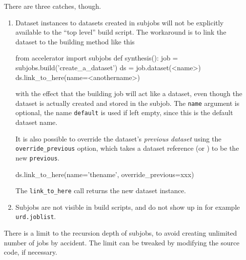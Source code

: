 There are three catches, though.
\begin{enumerate}
\item
Dataset instances to datasets created in subjobs will not be
explicitly available to the ``top level'' build script.  The workaround
is to link the dataset to the building method like this
\begin{python}
from accelerator import subjobs
def synthesis():
    job = subjobs.build('create_a_dataset')
    ds = job.dataset(<name>)
    ds.link_to_here(name=<anothername>)
\end{python}
with the effect that the building job will act like a dataset, even
though the dataset is actually created and stored in the subjob.  The
\texttt{name} argument is optional, the name \texttt{default} is used
if left empty, since this is the default dataset name.

It is also possible to override the dataset's \textsl{previous
dataset} using the \texttt{override\_previous} option, which takes a
dataset reference (or \pyNone) to be the
new \texttt{previous}.  
\begin{python}
    ds.link_to_here(name='thename', override_previous=xxx)
\end{python}
The \texttt{link\_to\_here} call returns the new dataset instance.

\item
  Subjobs are not visible in build scripts, and do not show up in
  for example \texttt{urd.joblist}.

\end{enumerate}
There is a limit to the recursion depth of subjobs, to avoid creating
unlimited number of jobs by accident.  The limit can be tweaked by
modifying the source code, if necessary.



